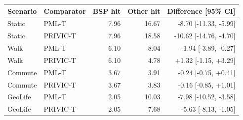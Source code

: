 \begin{tabular}{llrrr}
\toprule
Scenario & Comparator & BSP hit & Other hit & Difference [95\% CI] \\
\midrule
Static & PML-T & 7.96 & 16.67 & -8.70 [-11.33, -5.99] \\
Static & PRIVIC-T & 7.96 & 18.58 & -10.62 [-14.76, -4.70] \\
Walk & PML-T & 6.10 & 8.04 & -1.94 [-3.89, -0.27] \\
Walk & PRIVIC-T & 6.10 & 4.78 & +1.32 [-1.15, +3.29] \\
Commute & PML-T & 3.67 & 3.91 & -0.24 [-0.75, +0.41] \\
Commute & PRIVIC-T & 3.67 & 3.83 & -0.16 [-0.85, +1.01] \\
GeoLife & PML-T & 2.05 & 10.03 & -7.98 [-10.52, -3.58] \\
GeoLife & PRIVIC-T & 2.05 & 7.68 & -5.63 [-8.13, -1.05] \\
\bottomrule
\end{tabular}
